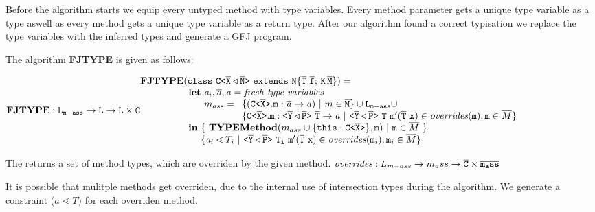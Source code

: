 \documentclass[a4paper,USenglish,cleveref, autoref, thm-restate]{lipics-v2021}
\begin{document}
Before the algorithm starts we equip every untyped method with type variables.
Every method parameter gets a unique type variable as a type aswell as every method gets a unique type variable as a return type.
After our algorithm found a correct typisation we replace the type variables with the inferred types and generate a GFJ program.

The algorithm \textbf{FJTYPE} is given as follows:

\noindent
$\fjtype : \mathtt{L_{m-ass} \rightarrow L \rightarrow L \times \ol{C}}\\
 \begin{array}{@{}l@{}l}
  \fjtype & (\mathtt{class } \ \exptype{C}{\ol{X} \triangleleft \ol{N}} \ \mathtt{ extends } \ \mathtt{N \{ \overline{T} \ \overline{f}; \, K \, \overline{M} \}}) =\\
  & \begin{array}{l@{}l@{}l}
    \textbf{let} &\ \tv{a}_i, \ol{\tv{a}}, \tv{a} = \textit{fresh type variables} \\ %
    &\ m_{ass} = \begin{array}[t]{l}
     \set{ (\exptype{C}{\ol{X}}.\mathtt{m} : \ol{\tv{a}} \to \tv{a}) \ |\ m \in \ol{M}}
     \cup \mathtt{L_{m-ass}} \cup \\
     \set{ \exptype{C}{\ol{X}}.\mathtt{m} : \mathtt{\exptype{}{\ol{Y} \triangleleft \ol{P}}\ \ol{T} \to \tv{a}}
      \ |\ \mathtt{\exptype{}{\ol{Y} \triangleleft \ol{P}}\ T\ m'(\ol{T}\ x)} \in \overridesFunc(\mathtt{m}), \mathtt{m} \in \overline{M}} \\ %
    \end{array}\\
  \textbf{in} & \{ \ \typeMethod( m_{ass} \cup \{ \mathtt{this} : \exptype{C}{\ol{X}} \}, \mathtt{m}) \ |\ \mathtt{m} \in \overline{M} \ \} \\ 
  & \set{ \tv{a}_i \lessdot T_i
  \ |\ \mathtt{\exptype{}{\ol{Y} \triangleleft \ol{P}}\ T_i\ m'(\ol{T}\ x)} \in \overridesFunc(\mathtt{m}_i), \mathtt{m}_i \in \overline{M}}
  \end{array}
\end{array}$

The \overridesFunc returns a set of method types, which are overriden by the given method.
$\textit{overrides} : L_{m-ass} \to m_ass \to \overline{\mathtt{C}} \times \overline{\tt m_ass}$

It is possible that mulitple methods get overriden, due to the internal use of intersection types during the \fjtype{} algorithm.
We generate a constraint ($a\lessdot T)$ for each overriden method.
\end{document}
